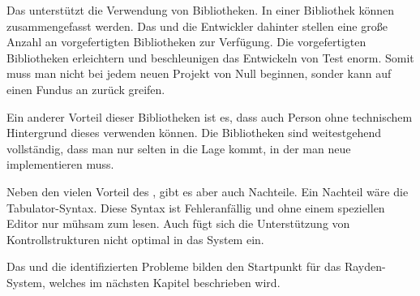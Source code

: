 \SuperPar
Das  unterstützt die Verwendung von Bibliotheken. In einer Bibliothek können  zusammengefasst werden. Das  und die Entwickler dahinter stellen eine große Anzahl an vorgefertigten Bibliotheken zur Verfügung. Die vorgefertigten Bibliotheken erleichtern und beschleunigen das Entwickeln von Test enorm. Somit muss man nicht bei jedem neuen Projekt von Null beginnen, sonder kann auf einen Fundus an  zurück greifen.

\SuperPar
Ein anderer Vorteil dieser Bibliotheken ist es, dass auch Person ohne technischem Hintergrund dieses  verwenden können. Die Bibliotheken sind weitestgehend vollständig, dass man nur selten in die Lage kommt, in der man neue  implementieren muss.

\SuperPar
Neben den vielen Vorteil des , gibt es aber auch Nachteile. Ein Nachteil wäre die Tabulator-Syntax. Diese Syntax ist Fehleranfällig und ohne einem speziellen Editor nur mühsam zum lesen. Auch fügt sich die Unterstützung von Kontrollstrukturen nicht optimal in das System ein.

\SuperPar
Das  und die identifizierten Probleme bilden den Startpunkt für das Rayden-System, welches im nächsten Kapitel beschrieben wird.

